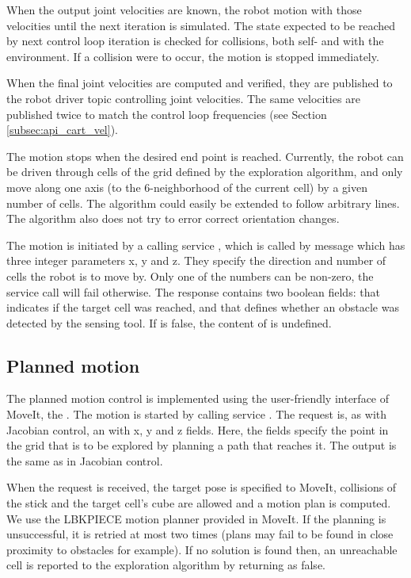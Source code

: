 \documentclass[buriama8_dp.tex]{subfiles}
\begin{document}
When the output joint velocities are known, the robot motion with those velocities until the next iteration is simulated. The state expected to be reached by next control loop iteration is checked for collisions, both self- and with the environment. If a collision were to occur, the motion is stopped immediately.

When the final joint velocities are computed and verified, they are published to the robot driver topic controlling joint velocities. The same velocities are published twice to match the control loop frequencies (see Section \ref{subsec:api_cart_vel}).

The motion stops when the desired end point is reached. Currently, the robot can be driven through cells of the grid defined by the exploration algorithm, and only move along one axis (to the 6-neighborhood of the current cell) by a given number of cells. The algorithm could easily be extended to follow arbitrary lines. The algorithm also does not try to error correct orientation changes.

The motion is initiated by a calling service , which is called by message   which has three integer parameters \m x, \m y and \m z. They specify the direction and number of cells the robot is to move by. Only one of the numbers can be non-zero, the service call will fail otherwise. The response contains two boolean fields:  that indicates if the target cell was reached, and  that defines whether an obstacle was detected by the sensing tool. If  is false, the content of  is undefined.

\subsection{Planned motion}
\label{subsec:impl_drv_plan}

The planned motion control is implemented using the user-friendly interface of MoveIt, the . The motion is started by calling service . The request is, as with Jacobian control, an  with \m x, \m y and \m z fields. Here, the fields specify the point in the grid that is to be explored by planning a path that reaches it. The output is the same as in Jacobian control.

When the request is received, the target pose is specified to MoveIt, collisions of the stick and the target cell's cube are allowed and a motion plan is computed. We use the LBKPIECE motion planner provided in MoveIt. If the planning is unsuccessful, it is retried at most two times (plans may fail to be found in close proximity to obstacles for example). If no solution is found then, an unreachable cell is reported to the exploration algorithm by returning  as false.
\end{document}
